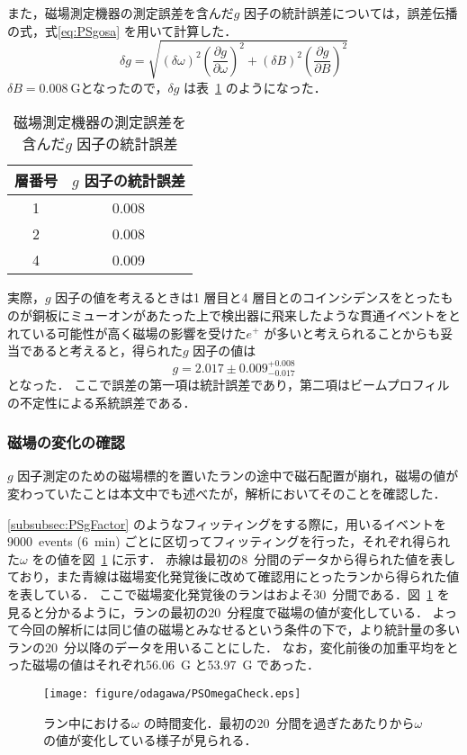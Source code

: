 また，磁場測定機器の測定誤差を含んだ$g$ 因子の統計誤差については，誤差伝播の式，式\eqref{eq:PSgosa} を用いて計算した．
\begin{equation}
\delta g = \sqrt{\left(\delta\omega\right)^{2}\left(\frac{\partial g}{\partial\omega}\right)^{2} + \left(\delta B\right)^{2}\left(\frac{\partial g}{\partial B}\right)^{2}}
\label{eq:PSgosa}
\end{equation}%
$\delta B = 0.008~\mathrm{G}$となったので，$\delta g$ は表~\ref{tab:PSgStatErr} のようになった．
\begin{table}
	\centering
	\caption{磁場測定機器の測定誤差を含んだ$g$ 因子の統計誤差}
	\begin{tabular}{cc}\toprule
	層番号 & $g$ 因子の統計誤差\\ \midrule
	1 & 0.008 \\ 
	2 & 0.008 \\
	4 & 0.009 \\ \bottomrule
	\end{tabular}\label{tab:PSgStatErr}
\end{table}%

実際，$g$ 因子の値を考えるときは1 層目と4 層目とのコインシデンスをとったものが銅板にミューオンがあたった上で検出器に飛来したような貫通イベントをとれている可能性が高く磁場の影響を受けた$e^{+}$ が多いと考えられることからも妥当であると考えると，得られた$g$ 因子の値は
\[g = 2.017 \pm 0.009 ^{+0.008}_{-0.017}\]
となった．
ここで誤差の第一項は統計誤差であり，第二項はビームプロフィルの不定性による系統誤差である．

\subsubsection{磁場の変化の確認}
\label{subsubsec:PSMagChangeCheck}

$g$ 因子測定のための磁場標的を置いたランの途中で磁石配置が崩れ，磁場の値が変わっていたことは本文中でも述べたが，解析においてそのことを確認した．

\ref{subsubsec:PSgFactor} のようなフィッティングをする際に，用いるイベントを9000~events (6~min) ごとに区切ってフィッティングを行った，それぞれ得られた$\omega$ をの値を図~\ref{fig:PSOmegaCheck} に示す．
赤線は最初の8~分間のデータから得られた値を表しており，また青線は磁場変化発覚後に改めて確認用にとったランから得られた値を表している．
ここで磁場変化発覚後のランはおよそ30~分間である．図~\ref{fig:PSOmegaCheck} を見ると分かるように，ランの最初の20~分程度で磁場の値が変化している．
よって今回の解析には同じ値の磁場とみなせるという条件の下で，より統計量の多いランの20~分以降のデータを用いることにした．
なお，変化前後の加重平均をとった磁場の値はそれぞれ56.06~G と53.97~G であった．
\begin{figure}[h]
	\centering
	\texttt{[image: figure/odagawa/PSOmegaCheck.eps]}
	\caption{ラン中における$\omega$ の時間変化．最初の20~分間を過ぎたあたりから$\omega$ の値が変化している様子が見られる．}
	\label{fig:PSOmegaCheck}
\end{figure}

